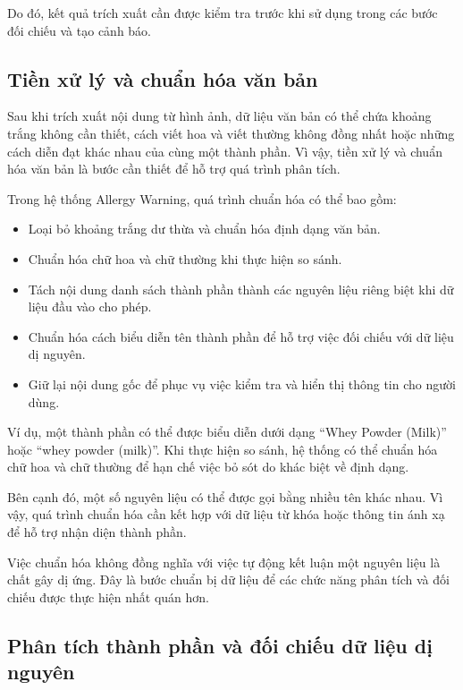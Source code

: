 	Do đó, kết quả trích xuất cần được kiểm tra trước khi sử dụng trong
	các bước đối chiếu và tạo cảnh báo.
	
	\subsection{Tiền xử lý và chuẩn hóa văn bản}
	
	Sau khi trích xuất nội dung từ hình ảnh, dữ liệu văn bản có thể
	chứa khoảng trắng không cần thiết, cách viết hoa và viết thường
	không đồng nhất hoặc những cách diễn đạt khác nhau của cùng một
	thành phần. Vì vậy, tiền xử lý và chuẩn hóa văn bản là bước cần
	thiết để hỗ trợ quá trình phân tích.
	
	Trong hệ thống Allergy Warning, quá trình chuẩn hóa có thể bao gồm:
	
	\begin{itemize}
		\item Loại bỏ khoảng trắng dư thừa và chuẩn hóa định dạng văn bản.
		\item Chuẩn hóa chữ hoa và chữ thường khi thực hiện so sánh.
		\item Tách nội dung danh sách thành phần thành các nguyên liệu riêng biệt khi dữ liệu đầu vào cho phép.
		\item Chuẩn hóa cách biểu diễn tên thành phần để hỗ trợ việc đối chiếu với dữ liệu dị nguyên.
		\item Giữ lại nội dung gốc để phục vụ việc kiểm tra và hiển thị thông tin cho người dùng.
	\end{itemize}
	
	Ví dụ, một thành phần có thể được biểu diễn dưới dạng
	``Whey Powder (Milk)'' hoặc ``whey powder (milk)''. Khi thực hiện
	so sánh, hệ thống có thể chuẩn hóa chữ hoa và chữ thường để hạn chế
	việc bỏ sót do khác biệt về định dạng.
	
	Bên cạnh đó, một số nguyên liệu có thể được gọi bằng nhiều tên
	khác nhau. Vì vậy, quá trình chuẩn hóa cần kết hợp với dữ liệu
	từ khóa hoặc thông tin ánh xạ để hỗ trợ nhận diện thành phần.
	
	Việc chuẩn hóa không đồng nghĩa với việc tự động kết luận một
	nguyên liệu là chất gây dị ứng. Đây là bước chuẩn bị dữ liệu để
	các chức năng phân tích và đối chiếu được thực hiện nhất quán hơn.
	
	\subsection{Phân tích thành phần và đối chiếu dữ liệu dị nguyên}
	
